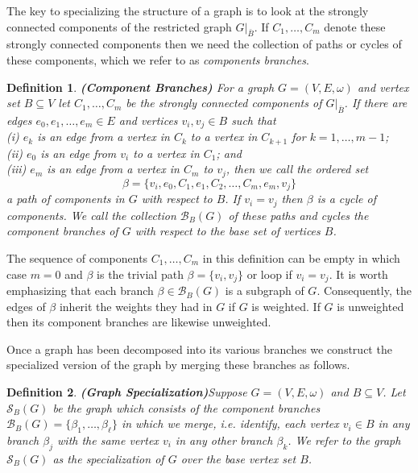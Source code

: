 \documentclass[10pt]{elsarticle}
\newtheorem{definition}{Definition}
\theoremstyle{remark}
\begin{document}
The key to specializing the structure of a graph is to look at the strongly connected components of the restricted graph $G|_{\bar{B}}$. If $C_1,\dots,C_m$ denote these strongly connected components then we need the collection of paths or cycles of these components, which we refer to as \emph{components branches}.

\begin{definition}\label{def:componentbranch} \textbf{(Component Branches)}
For a graph $G=(V,E,\omega)$ and vertex set $B\subseteq V$ let $C_1,\dots,C_m$ be the strongly connected components of $G|_{\bar{B}}$. If there are edges $e_0,e_1,\dots,e_m\in E$ and vertices $v_i,v_j\in B$ such that\\
\indent (i) $e_k$ is an edge from a vertex in $C_k$ to a vertex in $C_{k+1}$ for $k=1,\dots,m-1$;\\
\indent (ii) $e_0$ is an edge from $v_i$ to a vertex in $C_1$; and\\
\indent (iii) $e_m$ is an edge from a vertex in $C_m$ to $v_j$, then we call the ordered set
\[
\beta=\{v_i,e_{0},C_1,e_{1},C_2,\dots,C_m,e_{m},v_{j}\}
\]
a \emph{path of components} in $G$ with respect to $B$. If $v_i=v_j$ then $\beta$ is a \emph{cycle of components}. We call the collection $\mathcal{B}_B(G)$ of these paths and cycles the \emph{component branches} of $G$ with respect to the base set of vertices $B$.
\end{definition}

The sequence of components $C_1,\dots,C_m$ in this definition can be empty in which case $m=0$ and $\beta$ is the trivial path $\beta=\{v_i,v_j\}$ or loop if $v_i=v_j$. It is worth emphasizing that each branch $\beta\in\mathcal{B}_B(G)$ is a subgraph of $G$. Consequently, the edges of $\beta$ inherit the weights they had in $G$ if $G$ is weighted. If $G$ is unweighted then its component branches are likewise unweighted.

Once a graph has been decomposed into its various branches we construct the specialized version of the graph by merging these branches as follows.

\begin{definition} \textbf{(Graph Specialization)}\label{def:exp}
Suppose $G=(V,E,\omega)$ and $B\subseteq V$. Let $\mathcal{S}_B(G)$ be the graph which consists of the component branches $\mathcal{B}_{B}(G)=\{\beta_1,\dots,\beta_{\ell}\}$ in which we \emph{merge}, i.e. identify, each vertex $v_i\in B$ in any branch $\beta_j$ with the same vertex $v_i$ in any other branch $\beta_k$. We refer to the graph  $\mathcal{S}_B(G)$ as the \emph{specialization} of $G$ over the \emph{base} vertex set $B$.
\end{definition}
\end{document}
